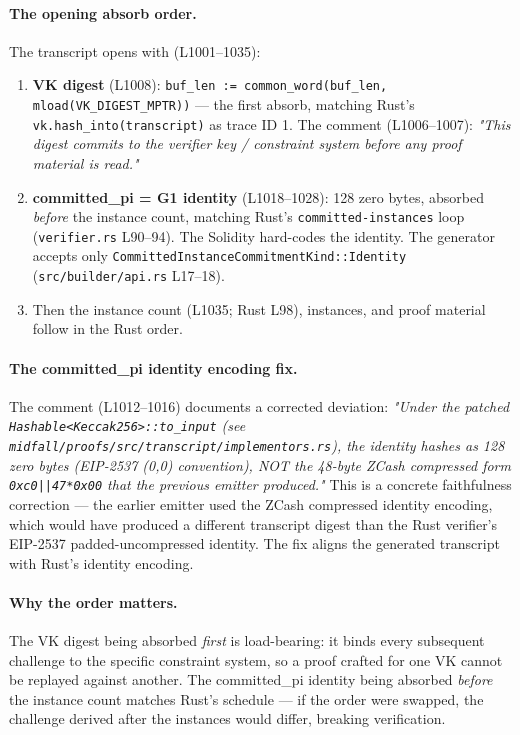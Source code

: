 \paragraph{The opening absorb order.} The transcript opens with
(L1001--1035):
\begin{enumerate}
\item \textbf{VK digest} (L1008):
  \texttt{buf\_\allowbreak{}len := common\_\allowbreak{}word(buf\_\allowbreak{}len,
  mload(VK\_\allowbreak{}DIGEST\_\allowbreak{}MPTR))} --- the first absorb, matching
  Rust's \texttt{vk.hash\_\allowbreak{}into(transcript)} as trace ID 1.
  The comment (L1006--1007): \emph{"This digest commits to the
  verifier key / constraint system before any proof material is
  read."}
\item \textbf{committed\_pi = G1 identity} (L1018--1028): 128
  zero bytes, absorbed \emph{before} the instance count, matching
  Rust's \texttt{committed-instances} loop (\texttt{verifier.rs}
  L90--94). The Solidity hard-codes the identity. The generator
  accepts only
  \texttt{CommittedInstance\allowbreak{}CommitmentKind::\allowbreak{}Identity}
  (\texttt{src/\allowbreak{}builder/\allowbreak{}api.rs} L17--18).
\item Then the instance count (L1035; Rust L98), instances, and
  proof material follow in the Rust order.
\end{enumerate}

\paragraph{The committed\_pi identity encoding fix.} The comment
(L1012--1016) documents a corrected deviation: \emph{"Under the
patched \texttt{Hashable<Keccak256>::to\_\allowbreak{}input} (see
\texttt{midfall/\allowbreak{}proofs/\allowbreak{}src/\allowbreak{}transcript/\allowbreak{}implementors.rs}), the
identity hashes as 128 zero bytes (EIP-2537 (0,0) convention),
NOT the 48-byte ZCash compressed form
\texttt{0xc0||47*0x00} that the previous emitter produced."}
This is a concrete faithfulness correction --- the earlier emitter
used the ZCash compressed identity encoding, which would have
produced a different transcript digest than the Rust verifier's
EIP-2537 padded-uncompressed identity. The fix aligns the
generated transcript with Rust's identity encoding.

\paragraph{Why the order matters.} The VK digest being absorbed
\emph{first} is load-bearing: it binds every subsequent challenge
to the specific constraint system, so a proof crafted for one VK
cannot be replayed against another. The committed\_pi identity
being absorbed \emph{before} the instance count matches Rust's
schedule --- if the order were swapped, the challenge derived
after the instances would differ, breaking verification.

